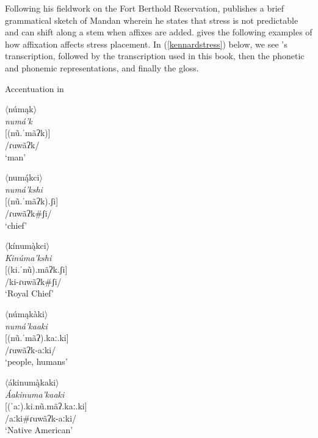 Following his fieldwork on the Fort Berthold Reservation, \citet{kennard1936} publishes a brief grammatical sketch of Mandan wherein he states that stress is not predictable and can shift along a stem when affixes are added. \citeauthor{kennard1936} gives the following examples of how affixation affects stress placement. In (\ref{kennardstress}) below, we see \citeauthor{kennard1936}'s transcription, followed by the transcription used in this book, then the phonetic and phonemic representations, and finally the gloss.



\begin{exe}
\item\label{kennardstress} Accentuation in \citet{kennard1936}


\begin{xlist}
\item $\langle$númąk$\rangle$\\
	\textit{numá'k}\\
 	{[}(nũ.ˈmãʔk)]\\
	/ɾuwãʔk/\\
	`man'

\item $\langle$numą́kci$\rangle$\\
	\textit{numá'kshi}\\
 	{[}(nũ.ˈmãʔk).ʃi]\\
	/ɾuwãʔk\#ʃi/\\
	`chief'

\item $\langle$kínumą̀kci$\rangle$\\
	\textit{Kinúma'kshi}\\
 	{[}(ki.ˈnũ).mãʔk.ʃi]\\
	/ki-ɾuwãʔk\#ʃi/\\
	`Royal Chief'

\item $\langle$númąkàki$\rangle$\\
	\textit{numá'kaaki}\\
 	{[}(nũ.ˈmãʔ).kaː.ki]\\
	/ɾuwãʔk-aːki/\\
	`people, humans'

\item $\langle$ákinumą̀kaki$\rangle$\\
	\textit{Áakinuma'kaaki}\\
  	{[}(ˈaː).ki.nũ.mãʔ.kaː.ki]\\
	/aːki\#ɾuwãʔk-aːki/\\
	`Native American'

\end{xlist}
\end{exe}

